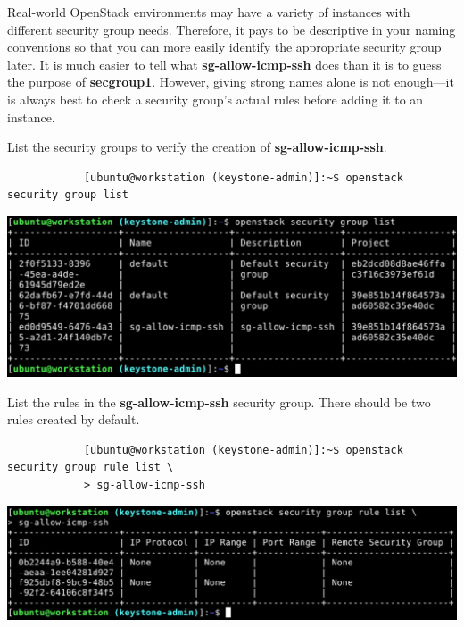 \documentclass[letterpaper, 12pt]{article}
\begin{document}
\begin{enumerate}
    \begin{tipbox}
        Real-world OpenStack environments may have a variety of instances with different security group needs.
        Therefore, it pays to be descriptive in your naming conventions so that you can more easily identify the appropriate security group later.
        It is much easier to tell what \textbf{sg-allow-icmp-ssh} does than it is to guess the purpose of \textbf{secgroup1}.
        However, giving strong names alone is not enough---it is always best to check a security group's actual rules before adding it to an instance.
    \end{tipbox}

    \begin{labstep}
        List the security groups to verify the creation of \textbf{sg-allow-icmp-ssh}.
        \begin{lstlisting}
            [ubuntu@workstation (keystone-admin)]:~$ openstack security group list
        \end{lstlisting}

        \begin{center}
            \includegraphics[width=\linewidth]{images/part9/step24.png}
        \end{center}
    \end{labstep}

    \begin{labstep}
        List the rules in the \textbf{sg-allow-icmp-ssh} security group.
        There should be two rules created by default.
        \begin{lstlisting}
            [ubuntu@workstation (keystone-admin)]:~$ openstack security group rule list \
            > sg-allow-icmp-ssh
        \end{lstlisting}

        \begin{center}
            \includegraphics[width=\linewidth]{images/part9/step25.png}
        \end{center}
    \end{labstep}


\end{enumerate}
\end{document}
